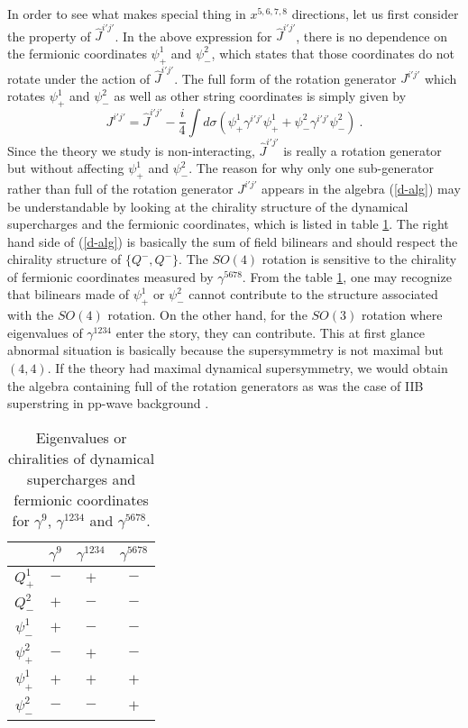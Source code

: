 \documentclass[a4paper,12pt]{article}
\begin{document}
In order to see what makes special thing in $x^{5,6,7,8}$ directions,
let us first consider the property of $\widehat{J}^{i'j'}$.  In the
above expression for $\widehat{J}^{i'j'}$, there is no dependence on
the fermionic coordinates $\psi^1_+$ and $\psi^2_-$, which states that
those coordinates do not rotate under the action of
$\widehat{J}^{i'j'}$.  The full form of the rotation generator
$J^{i'j'}$ which rotates $\psi^1_+$ and $\psi^2_-$ as well as other
string coordinates is simply given by
\begin{equation}
J^{i'j'} =
\widehat{J}^{i'j'} 
- \frac{i}{4} \int d \sigma ( \psi^1_+ \gamma^{i'j'}
 \psi^1_+ + \psi^2_- \gamma^{i'j'} \psi^2_- ) ~.
\end{equation}
Since the theory we study is non-interacting, $\widehat{J}^{i'j'}$ is
really a rotation generator but without affecting $\psi^1_+$ and
$\psi^2_-$.  The reason for why only one sub-generator rather than
full of the rotation generator $J^{i'j'}$ appears in the algebra
(\ref{d-alg}) may be understandable by looking at the chirality
structure of the dynamical supercharges and the fermionic coordinates,
which is listed in table \ref{t1}.  The right hand side of
(\ref{d-alg}) is basically the sum of field bilinears and should
respect the chirality structure of $\{ Q^-, Q^- \}$.  The $SO(4)$
rotation is sensitive to the chirality of fermionic coordinates
measured by $\gamma^{5678}$.  From the table \ref{t1}, one may
recognize that bilinears made of $\psi^1_+$ or $\psi^2_-$ cannot
contribute to the structure associated with the $SO(4)$ rotation.  On
the other hand, for the $SO(3)$ rotation where eigenvalues of
$\gamma^{1234}$ enter the story, they can contribute.  This at first
glance abnormal situation is basically because the supersymmetry is
not maximal but $(4,4)$.  If the theory had maximal dynamical
supersymmetry, we would obtain the algebra containing full of the
rotation generators as was the case of IIB superstring in pp-wave
background \cite{met044}.

\begin{table}
\begin{center}
\begin{tabular}{cccc}
\hline
   & $\gamma^9$ & $\gamma^{1234}$ & $\gamma^{5678}$ \\
\hline
 $Q^1_+$    & $-$ & $+$ & $-$ \\
 $Q^2_-$    & $+$ & $-$ & $-$ \\
\hline
 $\psi^1_-$ & $+$ & $-$ & $-$ \\
 $\psi^2_+$ & $-$ & $+$ & $-$ \\
\hline
 $\psi^1_+$ & $+$ & $+$ & $+$ \\
 $\psi^2_-$ & $-$ & $-$ & $+$ \\
\hline
\end{tabular}
\end{center}
\caption{Eigenvalues or chiralities of dynamical supercharges and 
fermionic coordinates for $\gamma^9$, $\gamma^{1234}$ and 
$\gamma^{5678}$.}
\label{t1}
\end{table}
\end{document}
